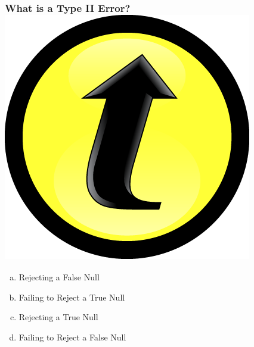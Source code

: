 \documentclass[handout]{beamer}
\begin{document}
\begin{frame}
\frametitle{What is a Type II Error? \includegraphics[scale = 0.05]{./images/clicker}}

\begin{enumerate}[(a)]
	\item Rejecting a False Null
	\item Failing to Reject a True Null
	\item Rejecting a True Null
	\item Failing to Reject a False Null
\end{enumerate}

\end{frame}
\end{document}
